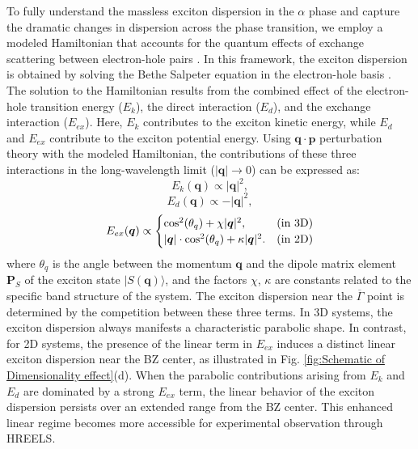 \documentclass[twocolumn,prl,showpacs,superscriptaddress,longbibliography]{revtex4-2}
\begin{document}
To fully understand the massless exciton dispersion in the $\alpha$
phase and capture the dramatic changes in dispersion across the phase
transition, we employ a modeled Hamiltonian that accounts for the
quantum effects of exchange scattering between electron-hole pairs
\citep{RN221,RN238,RN543}. In this framework, the exciton dispersion
is obtained by solving the Bethe Salpeter equation in the electron-hole
basis \citep{RN655,RN656,RN657}. The solution to the Hamiltonian
results from the combined effect of the electron-hole transition energy
($E_{k}$), the direct interaction ($E_{d}$), and the exchange interaction
($E_{ex}$). Here, $E_{k}$ contributes to the exciton kinetic energy,
while $E_{d}$ and $E_{ex}$ contribute to the exciton potential energy.
Using $\boldsymbol{q}\cdot\boldsymbol{p}$ perturbation theory with
the modeled Hamiltonian, the contributions of these three interactions
in the long-wavelength limit ($|\boldsymbol{q}|\rightarrow0$) can
be expressed as:
\begin{equation}
E_{k}(\boldsymbol{q})\propto|\boldsymbol{q}|^{2},
\end{equation}
\begin{equation}
E_{d}(\boldsymbol{q})\propto-|\boldsymbol{q}|^{2},
\end{equation}
\begin{equation}
E_{ex}(\boldsymbol{q})\propto\begin{cases}
\cos^{2}(\theta_{q})+\chi|\boldsymbol{q}|^{2}, & \text{\text{(in 3D)}}\\
|\boldsymbol{q}|\cdot\cos^{2}(\theta_{q})+\kappa|\boldsymbol{q}|^{2}. & \text{(in 2D)}
\end{cases}
\end{equation}
where $\theta_{q}$ is the angle between the momentum $\boldsymbol{q}$
and the dipole matrix element $\boldsymbol{P}_{S}$ of the exciton
state $|S(\boldsymbol{q})\rangle$, and the factors $\chi$, $\kappa$
are constants related to the specific band structure of the system.
The exciton dispersion near the $\overline{\Gamma}$ point is determined
by the competition between these three terms. In 3D systems, the exciton
dispersion always manifests a characteristic parabolic shape. In contrast,
for 2D systems, the presence of the linear term in $E_{ex}$ induces
a distinct linear exciton dispersion near the BZ center, as illustrated
in Fig. \ref{fig:Schematic of Dimensionality effect}(d). When the
parabolic contributions arising from $E_{k}$ and $E_{d}$ are dominated
by a strong $E_{ex}$ term, the linear behavior of the exciton dispersion
persists over an extended range from the BZ center. This enhanced
linear regime becomes more accessible for experimental observation
through HREELS.
\end{document}
